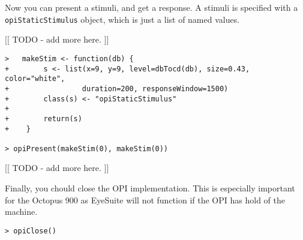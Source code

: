 \documentclass{article}
\begin{document}
Now you can present a stimuli, and get a response. A stimuli is specified with a {\tt
opiStaticStimulus} object, which is just a list of named values.

[[ TODO - add more here. ]]

\begin{verbatim}
>   makeStim <- function(db) {
+        s <- list(x=9, y=9, level=dbTocd(db), size=0.43, color="white",
+                 duration=200, responseWindow=1500)
+        class(s) <- "opiStaticStimulus"
+
+        return(s)
+    }

> opiPresent(makeStim(0), makeStim(0))
\end{verbatim}            
                          
[[ TODO - add more here. ]]

Finally, you chould close the OPI implementation. This is especially important for the Octopus
900 as EyeSuite will not function if the OPI has hold of the machine.

\begin{verbatim}
> opiClose()
\end{verbatim}
\end{document}
